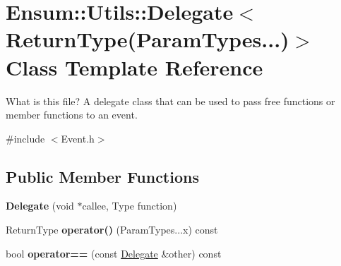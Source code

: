 \hypertarget{class_ensum_1_1_utils_1_1_delegate_3_01_return_type_07_param_types_8_8_8_08_4}{}\section{Ensum\+:\+:Utils\+:\+:Delegate$<$ Return\+Type(Param\+Types...)$>$ Class Template Reference}
\label{class_ensum_1_1_utils_1_1_delegate_3_01_return_type_07_param_types_8_8_8_08_4}


What is this file? A delegate class that can be used to pass free functions or member functions to an event.  




{\ttfamily \#include $<$Event.\+h$>$}

\subsection*{Public Member Functions}
\begin{DoxyCompactItemize}
\item 
{\bfseries Delegate} (void $\ast$callee, Type function)\hypertarget{class_ensum_1_1_utils_1_1_delegate_3_01_return_type_07_param_types_8_8_8_08_4_aa036c0c84a557b6fd5be7792341fed85}{}\label{class_ensum_1_1_utils_1_1_delegate_3_01_return_type_07_param_types_8_8_8_08_4_aa036c0c84a557b6fd5be7792341fed85}

\item 
Return\+Type {\bfseries operator()} (Param\+Types...\+x) const \hypertarget{class_ensum_1_1_utils_1_1_delegate_3_01_return_type_07_param_types_8_8_8_08_4_a3ae424e1c121efb7ce4f04f4af2d10ec}{}\label{class_ensum_1_1_utils_1_1_delegate_3_01_return_type_07_param_types_8_8_8_08_4_a3ae424e1c121efb7ce4f04f4af2d10ec}

\item 
bool {\bfseries operator==} (const \hyperlink{class_ensum_1_1_utils_1_1_delegate}{Delegate} \&other) const \hypertarget{class_ensum_1_1_utils_1_1_delegate_3_01_return_type_07_param_types_8_8_8_08_4_a7a814e851eb3a97f9b4a4ae4998a4eb8}{}\label{class_ensum_1_1_utils_1_1_delegate_3_01_return_type_07_param_types_8_8_8_08_4_a7a814e851eb3a97f9b4a4ae4998a4eb8}

\end{DoxyCompactItemize}
